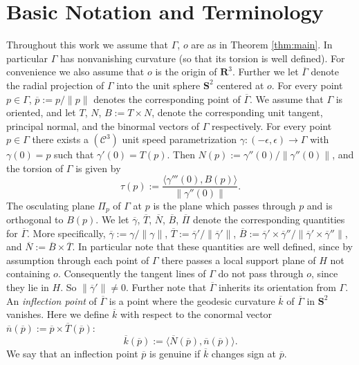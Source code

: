 \documentclass[11pt]{amsart}
\theoremstyle{definition}
\newcommand{\R}{\mathbf{R}}
\newcommand{\ol}{\overline}
\newcommand{\C}{\mathcal{C}}
\renewcommand{\S}{\mathbf{S}}
\renewcommand{\(}{\left(}
\renewcommand{\)}{\right)}
\begin{document}
\section{Basic Notation and Terminology}
Throughout this work we assume that $\Gamma$, $o$ are as in Theorem \ref{thm:main}. In particular $\Gamma$ has nonvanishing curvature (so that its torsion is well defined). For convenience we also assume that $o$ is the origin of $\R^3$. Further we let $\ol\Gamma$ denote the radial projection of $\Gamma$ into the unit sphere $\S^2$ centered at $o$. For every point $p\in\Gamma$, $\ol p:=p/\|p\|$ denotes the corresponding point of $\ol\Gamma$. We assume that $\Gamma$ is oriented, and let $T$, $N$, $B:=T\times N$, denote the corresponding unit tangent, principal normal, and the binormal vectors of $\Gamma$ respectively. For every point $p\in\Gamma$ there exists a $(\C^3)$ unit speed parametrization $\gamma\colon (-\epsilon,\epsilon)\to \Gamma$ with $\gamma(0)=p$ such that $\gamma'(0)=T(p)$. Then $N(p):=\gamma''(0)/\|\gamma''(0)\|$, and  the torsion of $\Gamma$ is given by 
$$
\tau(p):=\frac{\langle \gamma'''(0),B(p)\rangle}{\|\gamma''(0)\|}.
$$
 The osculating plane $\Pi_p$ of $\Gamma$ at $p$ is the plane which passes through $p$ and is orthogonal to $B(p)$. We let $\ol\gamma$, $\ol T$, $\ol N$, $\ol B$,   $\ol \Pi$ denote the corresponding quantities for $\ol\Gamma$. More specifically, $\ol\gamma:=\gamma/\|\gamma\|$, $\ol T:=\ol\gamma'/\|\ol\gamma'\|$, $\ol B:=\ol\gamma'\times\ol\gamma''/\|\ol\gamma'\times\ol\gamma''\|$, and $\ol N:=\ol B\times \ol T$. In particular note that these quantities are well defined, since by assumption through each point of $\Gamma$ there passes a local support plane of $H$ not containing $o$. Consequently the tangent lines of $\Gamma$ do not pass through $o$, since they  lie in $H$. So $\|\ol\gamma'\|\neq 0$.
 Further note that $\ol\Gamma$ inherits its orientation from $\Gamma$.
An \emph{inflection point} of $\ol\Gamma$ is a point where the geodesic curvature $\ol k$ of $\ol\Gamma$ in $\S^2$ vanishes. Here we define $\ol k$ with respect to the conormal vector $\ol n(\ol p):=\ol p\times \ol T(\ol p)$:
$$
\ol k(\ol p):=\langle \ol N(\ol p),\ol n(\ol p)\rangle.
$$
We say that an inflection point $\ol p$ is genuine if $\ol k$ changes sign at $\ol p$.
\end{document}
